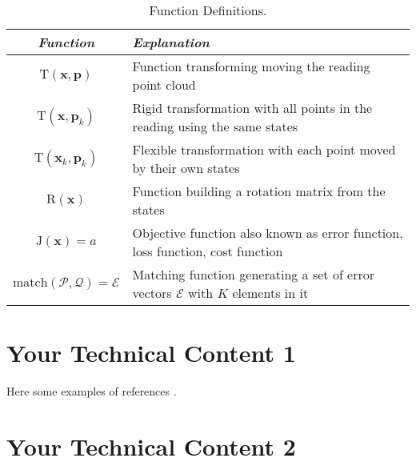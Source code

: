 \documentclass[12pt,letterpaper,oneside]{article}
\begin{document}
\begin{table}[htbp]
\centering
\caption{Function Definitions.}
\label{tab:functions}
\begin{tabu}{cX}

\toprule
\emph{Function} & \emph{Explanation} \\
\midrule

$\mathrm{T}(\bm{x}, \bm{p})$ & Function transforming moving the reading point cloud \\
$\mathrm{T}(\bm{x}, \bm{p}_k)$ & Rigid transformation with all points in the reading using the same states\\
$\mathrm{T}(\bm{x}_k, \bm{p}_k)$ & Flexible transformation with each point moved by their own states\\
$\mathrm{R}(\bm{x})$ & Function building a rotation matrix from the states \\
$\mathrm{J}(\bm{x}) = a$ & Objective function also known as error function, loss function, cost function\\
$\mathrm{match}(\mathcal{P}, \mathcal{Q}) = \mathcal{E}$ & Matching function generating a set of error vectors $\mathcal{E}$ with $K$ elements in it\\

\bottomrule

\end{tabu}
\end{table}

\newpage
\section{Your Technical Content 1}%
Here some examples of references \cite{Pomerleau2013,Pomerleau2014}.
\lightlipsum[1-2]

\newpage
\section{Your Technical Content 2}%
\lightlipsum[1-2]

\printbibliography
\end{document}
